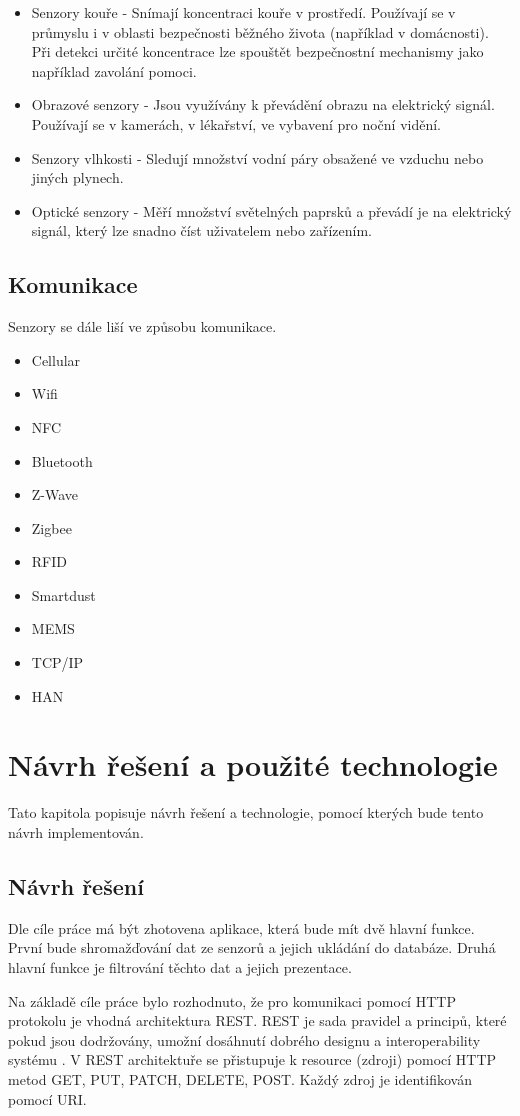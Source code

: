\documentclass[thesis=M,czech]{FITthesis}[2018/10/20]
\begin{document}
\begin{itemize}
  \item Senzory kouře - Snímají koncentraci kouře v prostředí. Používají se v průmyslu i v oblasti bezpečnosti běžného života (například v domácnosti). Při detekci určité koncentrace lze spouštět bezpečnostní mechanismy jako například zavolání pomoci.
   \item Obrazové senzory - Jsou využívány k převádění obrazu na elektrický signál. Používají se v kamerách, v lékařství, ve vybavení pro noční vidění. 
  \item Senzory vlhkosti - Sledují množství vodní páry obsažené ve vzduchu nebo jiných plynech.
  \item Optické senzory - Měří množství světelných paprsků a převádí je na elektrický signál, který lze snadno číst uživatelem nebo zařízením.
\end{itemize}
	\section{Komunikace}
Senzory se dále liší ve způsobu komunikace.
\begin{itemize}
  \item Cellular
  \item Wifi
  \item NFC
  \item Bluetooth
  \item Z-Wave
  \item Zigbee
  \item RFID
  \item Smartdust
  \item MEMS
  \item TCP/IP
  \item HAN
\end{itemize}
\chapter{Návrh řešení a použité technologie}\label{textcompr}
Tato kapitola popisuje návrh řešení a technologie, pomocí kterých bude tento návrh implementován.

	\section{Návrh řešení}
	Dle cíle práce má být zhotovena aplikace, která bude mít dvě hlavní funkce. První bude shromažďování dat ze senzorů a jejich ukládání do databáze. Druhá hlavní funkce je filtrování těchto dat a jejich prezentace.
	
	Na základě cíle práce bylo rozhodnuto, že pro komunikaci pomocí HTTP protokolu je vhodná architektura REST. REST je sada pravidel a principů, které pokud jsou dodržovány, umožní dosáhnutí dobrého designu a interoperability systému \cite{rest-about}. V REST architektuře se přistupuje k resource (zdroji) pomocí HTTP metod GET, PUT, PATCH, DELETE, POST. Každý zdroj je identifikován pomocí URI.
	
\end{document}

